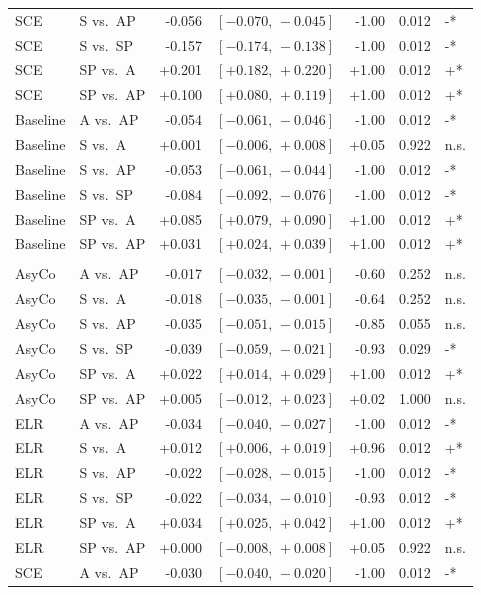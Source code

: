 \begin{table}[h!]
\begin{tabular}{llrrrrl}
SCE & S vs.\ AP & -0.056 & $[-0.070,\,-0.045]$ & -1.00 & 0.012 & -* \\
SCE & S vs.\ SP & -0.157 & $[-0.174,\,-0.138]$ & -1.00 & 0.012 & -* \\
SCE & SP vs.\ A & +0.201 & $[+0.182,\,+0.220]$ & +1.00 & 0.012 & +* \\
SCE & SP vs.\ AP & +0.100 & $[+0.080,\,+0.119]$ & +1.00 & 0.012 & +* \\
Baseline & A vs.\ AP & -0.054 & $[-0.061,\,-0.046]$ & -1.00 & 0.012 & -* \\
Baseline & S vs.\ A & +0.001 & $[-0.006,\,+0.008]$ & +0.05 & 0.922 & n.s. \\
Baseline & S vs.\ AP & -0.053 & $[-0.061,\,-0.044]$ & -1.00 & 0.012 & -* \\
Baseline & S vs.\ SP & -0.084 & $[-0.092,\,-0.076]$ & -1.00 & 0.012 & -* \\
Baseline & SP vs.\ A & +0.085 & $[+0.079,\,+0.090]$ & +1.00 & 0.012 & +* \\
Baseline & SP vs.\ AP & +0.031 & $[+0.024,\,+0.039]$ & +1.00 & 0.012 & +* \\
\addlinespace
\multicolumn{7}{l}{\textit{Macro AUC}} \\
AsyCo & A vs.\ AP & -0.017 & $[-0.032,\,-0.001]$ & -0.60 & 0.252 & n.s. \\
AsyCo & S vs.\ A & -0.018 & $[-0.035,\,-0.001]$ & -0.64 & 0.252 & n.s. \\
AsyCo & S vs.\ AP & -0.035 & $[-0.051,\,-0.015]$ & -0.85 & 0.055 & n.s. \\
AsyCo & S vs.\ SP & -0.039 & $[-0.059,\,-0.021]$ & -0.93 & 0.029 & -* \\
AsyCo & SP vs.\ A & +0.022 & $[+0.014,\,+0.029]$ & +1.00 & 0.012 & +* \\
AsyCo & SP vs.\ AP & +0.005 & $[-0.012,\,+0.023]$ & +0.02 & 1.000 & n.s. \\
ELR & A vs.\ AP & -0.034 & $[-0.040,\,-0.027]$ & -1.00 & 0.012 & -* \\
ELR & S vs.\ A & +0.012 & $[+0.006,\,+0.019]$ & +0.96 & 0.012 & +* \\
ELR & S vs.\ AP & -0.022 & $[-0.028,\,-0.015]$ & -1.00 & 0.012 & -* \\
ELR & S vs.\ SP & -0.022 & $[-0.034,\,-0.010]$ & -0.93 & 0.012 & -* \\
ELR & SP vs.\ A & +0.034 & $[+0.025,\,+0.042]$ & +1.00 & 0.012 & +* \\
ELR & SP vs.\ AP & +0.000 & $[-0.008,\,+0.008]$ & +0.05 & 0.922 & n.s. \\
SCE & A vs.\ AP & -0.030 & $[-0.040,\,-0.020]$ & -1.00 & 0.012 & -* \\

\end{tabular}
\end{table}
